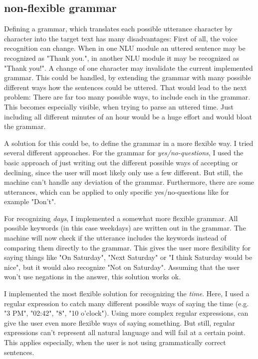 \documentclass[
	11pt, %
]{fphw}
\begin{document}
\subsection*{non-flexible grammar}
Defining a grammar, which translates each possible utterance character by character into the target
text has many disadvantages: First of all, the voice recognition can change. When in one NLU module
an uttered sentence may be recognized as "Thank you.", in another NLU module it may be recognized 
as "Thank you!". A change of one character may invalidate the current implemented grammar. 
This could be handled, by extending the grammar with many possible different ways how the sentences could be
uttered. That would lead to the next problem: There are far too many possible ways, to include each
in the grammar. This becomes especially visible, when trying to parse an uttered time. Just including 
all different minutes of an hour would be a huge effort and would bloat the grammar.

A solution for this could be, to define the grammar in a more flexible way. I tried several different
approaches. For the grammar for \emph{yes/no-questions}, I used the basic approach of just writing out the
different possible ways of accepting or declining, since the user will most likely only use a few 
different. But still, the machine can't handle any deviation of the grammar. Furthermore, there are 
some utterances, which can be applied to only specific yes/no-questions like for example "Don't".

For recognizing \emph{days}, I implemented a somewhat more flexible grammar. All possible keywords (in 
this case weekdays) are written out in the grammar. The machine will now check if the utterance includes
the keywords instead of comparing them directly to the grammar. This gives the user more flexibility for
saying things like "On Saturday", "Next Saturday" or "I think Saturday would be nice", but it would
also recognize "Not on Saturday". Assuming that the user won't use negations in the answer, this solution
works ok. 

I implemented the most flexible solution for recognizing the \emph{time}. Here, I used a regular
expression to catch many different possible ways of saying the time (e.g. "3 PM", "02:42", "8",
"10 o'clock"). Using more complex regular expressions, can give the user even more flexible ways
of saying something. But still, regular expressions can't represent all natural language and will
fail at a certain point. This applies especially, when the user is not using grammatically correct 
sentences.
\end{document}
